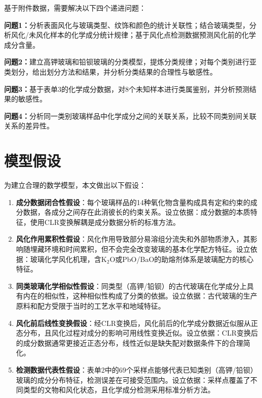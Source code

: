 \documentclass[12pt,a4paper]{ctexart}
\begin{document}
基于附件数据，需要解决以下四个递进问题：

\textbf{问题1：}分析表面风化与玻璃类型、纹饰和颜色的统计关联性；结合玻璃类型，分析风化/未风化样本的化学成分统计规律；基于风化点检测数据预测风化前的化学成分含量。

\textbf{问题2：}建立高钾玻璃和铅钡玻璃的分类模型，提炼分类规律；对每个类别进行亚类划分，给出划分方法和结果，并分析分类结果的合理性与敏感性。

\textbf{问题3：}基于表单3的化学成分数据，对8个未知样本进行类属鉴别，并分析预测结果的敏感性。

\textbf{问题4：}分析同一类别玻璃样品中化学成分之间的关联关系，比较不同类别间关联关系的差异性。

\newpage

\section{模型假设}

为建立合理的数学模型，本文做出以下假设：

\begin{enumerate}[label=(\arabic*), leftmargin=*]
    \item \textbf{成分数据闭合性假设}：每个玻璃样品的14种氧化物含量构成具有定和约束的成分数据，各成分之间存在此消彼长的约束关系。设立依据：成分数据的本质特征\cite{2}，使用CLR变换解耦是成分数据分析的标准方法。
    \item \textbf{风化作用累积性假设}：风化作用导致部分易溶组分流失和外部物质渗入，其影响随埋藏环境和时间累积，但不会完全改变玻璃的基本化学配方特征。设立依据：玻璃化学风化机理\cite{3}，含K$_2$O或PbO/BaO的助熔剂体系是玻璃配方的核心特征。
    \item \textbf{同类玻璃化学相似性假设}：同类型（高钾/铅钡）的古代玻璃在化学成分上具有内在的相似性，这种相似性构成了分类的依据。设立依据：古代玻璃的生产原料和配方受限于当时的工艺水平和地域特征\cite{1}。
    \item \textbf{风化前后线性变换假设}：经CLR变换后，风化前后的化学成分数据近似服从正态分布，且风化过程对成分的影响可用线性变换近似。设立依据：CLR变换后的成分数据通常更接近正态分布\cite{2}，线性近似是缺失配对数据条件下的合理简化。
    \item \textbf{检测数据代表性假设}：表单2中的69个采样点能够代表已知类别（高钾/铅钡）玻璃的成分分布特征，检测误差在可接受范围内。设立依据：采样点覆盖了不同类型的文物和风化状态，且化学成分检测采用标准分析方法。
\end{enumerate}
\end{document}
